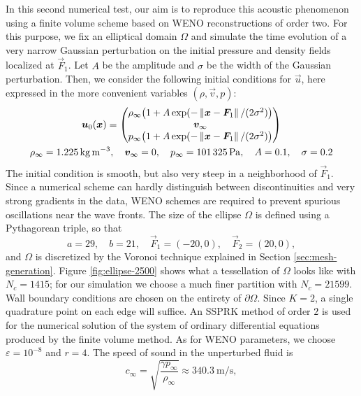 In this second numerical test, our aim is to reproduce this acoustic
phenomenon using a finite volume scheme based on WENO reconstructions
of order two. For this purpose, we fix an elliptical domain $\Omega$
and simulate the time evolution of a very narrow Gaussian perturbation on
the initial pressure and density fields localized at $\vec{F}_1$.
Let $A$ be the amplitude and $\sigma$ be the width of the Gaussian perturbation.
Then, we consider the following initial conditions for $\vec{u}$, here
expressed in the more convenient variables $(\rho,\vec{v},p)$:
\begin{equation} \label{eq:ellipse-initial-conditions}
\begin{gathered}
\vec{u}_0(\vec{x}) =
\begin{pmatrix}
\rho_\infty  \bigl( 1 + A \exp(-\norm{\vec{x}-\vec{F}_1}/(2\sigma^2) \bigr) \\ 
\vec{v}_\infty \\
p_\infty \bigl( 1 + A \exp(-\norm{\vec{x}-\vec{F}_1}/(2\sigma^2) \bigr)
\end{pmatrix} \\
\rho_\infty = \SI{1,225}{\kg\per\meter\cubed},
\quad \vec{v}_\infty = 0,
\quad p_\infty = \SI{101325}{\pascal},
\quad A = 0.1,
\quad \sigma = 0.2
\end{gathered}
\end{equation}
The initial condition is smooth, but also very steep in a neighborhood
of $\vec{F}_1$. Since a numerical scheme can hardly distinguish
between discontinuities and very strong gradients in the data,
WENO schemes are required to prevent spurious oscillations
near the wave fronts.
The size of the ellipse $\Omega$ is defined using a Pythagorean triple, so that
\[
a = 29, \quad b = 21, \quad \vec{F}_1 = (-20,0), \quad \vec{F}_2 = (20,0),
\]
and $\Omega$ is discretized by the Voronoi technique explained in
Section \ref{sec:mesh-generation}. Figure \ref{fig:ellipse-2500} shows what a
tessellation of $\Omega$ looks like with $N_c = 1415$; for our simulation we choose
a much finer partition with $N_c = 21599$. Wall boundary conditions
are chosen on the entirety of $\partial\Omega$. Since $K = 2$, a single
quadrature point on each edge will suffice. An SSPRK method of order $2$
is used for the numerical solution of the system of ordinary differential
equations produced by the finite volume method. As for WENO parameters,
we choose $\varepsilon = 10^{-8}$ and $r = 4$.
The speed of sound in the unperturbed fluid is
\[
c_\infty = \sqrt{\frac{\gamma p_\infty}{\rho_\infty}}
\approx \SI{340,3}{\meter\per\second},
\]
